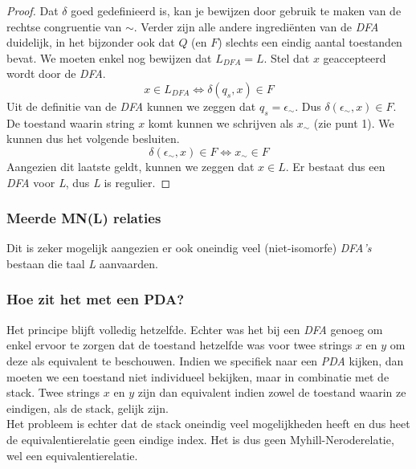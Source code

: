 \begin{proof}
  Dat $\delta$ goed gedefinieerd is, kan je bewijzen door gebruik te maken van de rechtse congruentie van $\sim$. Verder zijn alle andere ingredi\"enten van de \emph{DFA} duidelijk, in het bijzonder ook dat $Q$ (en $F$) slechts een eindig aantal toestanden bevat. We moeten enkel nog bewijzen dat $L_{DFA} = L$. Stel dat $x$ geaccepteerd wordt door de \emph{DFA}.
  $$x \in L_{DFA} \iff \delta(q_s, x) \in F$$
  Uit de definitie van de \emph{DFA} kunnen we zeggen dat $q_s = \epsilon_{\sim}$. Dus $\delta(\epsilon_{\sim},x) \in F$. De toestand waarin string $x$ komt kunnen we schrijven als $x_{\sim}$ (zie punt 1). We kunnen dus het volgende besluiten.
  $$\delta(\epsilon_{\sim},x) \in F \iff x_{\sim} \in F$$
  Aangezien dit laatste geldt, kunnen we zeggen dat $x \in L$. Er bestaat dus een \emph{DFA} voor \emph{L}, dus \emph{L} is regulier.
\end{proof}

\subsubsection*{Meerde MN(L) relaties}

Dit is zeker mogelijk aangezien er ook oneindig veel (niet-isomorfe) \emph{DFA's} bestaan die taal \emph{L} aanvaarden.

\subsubsection*{Hoe zit het met een PDA?}

Het principe blijft volledig hetzelfde. Echter was het bij een \emph{DFA} genoeg om enkel ervoor te zorgen dat de toestand hetzelfde was voor twee strings $x$ en $y$ om deze als equivalent te beschouwen. Indien we specifiek naar een \emph{PDA} kijken, dan moeten we een toestand niet individueel bekijken, maar in combinatie met de stack. Twee strings $x$ en $y$ zijn dan equivalent indien zowel de toestand waarin ze eindigen, als de stack, gelijk zijn.\\

Het probleem is echter dat de stack oneindig veel mogelijkheden heeft en dus heet de equivalentierelatie geen eindige index. Het is dus geen Myhill-Neroderelatie, wel een equivalentierelatie.
